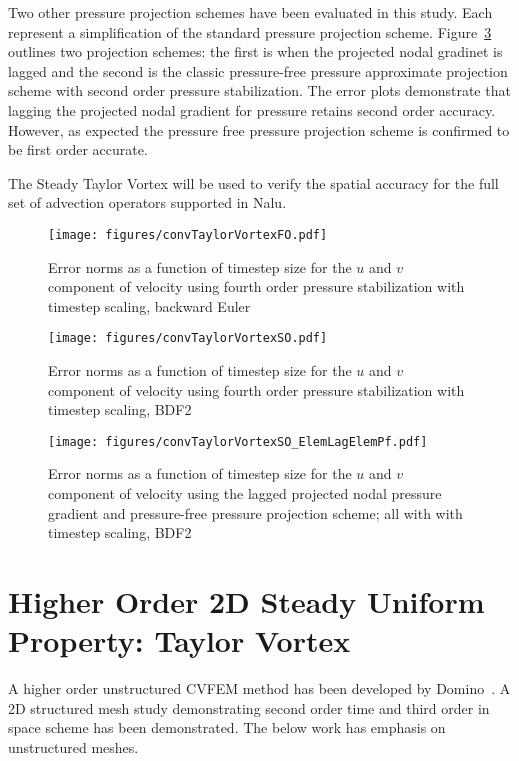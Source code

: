 Two other pressure projection schemes have been evaluated in this study. Each represent a 
simplification of the standard pressure projection scheme. Figure~\ref{fig:hybridTstep} outlines
two projection schemes: the first is when the projected nodal gradinet is lagged and the 
second is the classic pressure-free pressure approximate projection scheme with second
order pressure stabilization. The error plots demonstrate that lagging the projected nodal
gradient for pressure retains second order accuracy. However, as expected the pressure
free pressure projection scheme is confirmed to be first order accurate.

The Steady Taylor Vortex will be used to verify the spatial accuracy for the full set of advection
operators supported in Nalu.
 
\begin{figure}
\centerline{\texttt{[image: figures/convTaylorVortexFO.pdf]}}
\caption{Error norms as a function of timestep size for the $u$ and $v$
component of velocity using fourth order pressure stabilization with timestep scaling, backward Euler}
\label{fig:fo4thTstep}
\end{figure}

\begin{figure}
\centerline{\texttt{[image: figures/convTaylorVortexSO.pdf]}}
\caption{Error norms as a function of timestep size for the $u$ and $v$
component of velocity using fourth order pressure stabilization with timestep scaling, BDF2}
\label{fig:so4thTstep}
\end{figure}

\begin{figure}
\centerline{\texttt{[image: figures/convTaylorVortexSO\_ElemLagElemPf.pdf]}}
\caption{Error norms as a function of timestep size for the $u$ and $v$
component of velocity using the lagged projected nodal pressure gradient and pressure-free pressure projection scheme; all with with timestep scaling, BDF2}
\label{fig:hybridTstep}
\end{figure}

\section{Higher Order 2D Steady Uniform Property: Taylor Vortex}

A higher order unstructured CVFEM method has been developed by Domino~\cite{Domino:2014}. 
A 2D structured mesh study demonstrating second order time and third order in space scheme 
has been demonstrated. The below work has emphasis on unstructured meshes.

